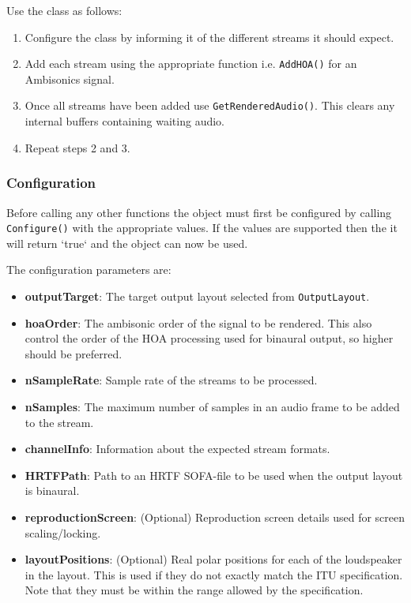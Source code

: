 \documentclass[12pt]{report}
\newcommand{\code}[1]{\texttt{#1}}
\begin{document}
Use the class as follows:
\begin{enumerate}
    \item Configure the class by informing it of the different streams it should expect.
    \item Add each stream using the appropriate function i.e. \code{AddHOA()} for an Ambisonics signal.
    \item Once all streams have been added use \code{GetRenderedAudio()}. This clears any internal buffers containing waiting audio.
    \item Repeat steps 2 and 3.
\end{enumerate}

\subsubsection{Configuration}

Before calling any other functions the object must first be configured by calling \code{Configure()} with the appropriate values. If the values are supported then the it will return `true` and the object can now be used.

The configuration parameters are:
\begin{itemize}
    \item \textbf{outputTarget}: The target output layout selected from \code{OutputLayout}.
    \item \textbf{hoaOrder}: The ambisonic order of the signal to be rendered. This also control the order of the HOA processing used for binaural output, so higher should be preferred.
    \item \textbf{nSampleRate}: Sample rate of the streams to be processed.
    \item \textbf{nSamples}: The maximum number of samples in an audio frame to be added to the stream.
    \item \textbf{channelInfo}: Information about the expected stream formats.
    \item \textbf{HRTFPath}: Path to an HRTF SOFA-file to be used when the output layout is binaural.
    \item \textbf{reproductionScreen}: (Optional) Reproduction screen details used for screen scaling/locking.
    \item \textbf{layoutPositions}: (Optional) Real polar positions for each of the loudspeaker in the layout. This is used if they do not exactly match the ITU specification. Note that they must be within the range allowed by the specification.
\end{itemize}
\end{document}
